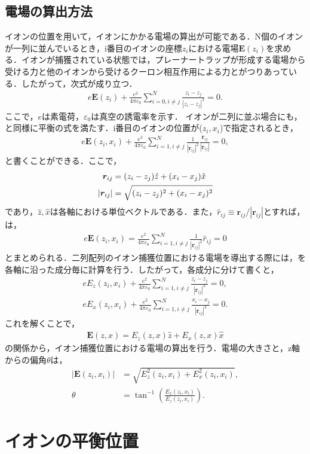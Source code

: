 \subsection{電場の算出方法}
イオンの位置を用いて，イオンにかかる電場の算出が可能である．N個のイオンが一列に並んでいるとき，i番目のイオンの座標$z_{i}$における電場$\bm{E}(z_{i})$を求める．イオンが捕獲されている状態では，プレーナートラップが形成する電場から受ける力と他のイオンから受けるクーロン相互作用による力とがつりあっている．したがって，次式が成り立つ．
\large
\begin{align}\label{eq:equi_string}
e\bm{E}(z_i) + \frac{e^2}{4\pi \varepsilon_0} \sum^N_{i=0,i\neq j} \frac{z_i - z_j}{|z_i - z_j|^3} = 0.
\end{align}
\normalsize
ここで，$e$は素電荷，$\varepsilon_0$は真空の誘電率を示す．
イオンが二列に並ぶ場合にも，と同様に平衡の式を満たす．i番目のイオンの位置が($z_i,x_i$)で指定されるとき，
\large
\begin{align}\label{eq:equi_array}
e\bm{E}(z_i,x_i) + \frac{e^2}{4\pi \varepsilon_0}\sum^N_{i=1,i\neq j}\frac{1}{|\bm{r}_{ij}|^2}\frac{\bm{r}_{ij}}{|\bm{r}_{ij}|} = 0,
\end{align}
\normalsize
と書くことができる．ここで，
\large
\begin{align}
\bm{r}_{ij} &= (z_i - z_j)\hat{z} + (x_i - x_j)\hat{x} \notag \\
|\bm{r}_{ij}| &= \sqrt{(z_i - z_j)^2 + (x_i - x_j)^2} \notag 
\end{align}
\normalsize
であり，$\hat{z},\hat{x}$は各軸における単位ベクトルである．また，$\hat{r}_{ij} \equiv \bm{r}_{ij}/|\bm{r}_{ij}|$とすれば，は，
\large
\begin{align}\label{eq:equi_array_2}
e\bm{E}(z_i,x_i) = \frac{e^2}{4\pi \varepsilon_0}\sum^N_{i=1,i\neq j} \frac{1}{|\bm{r}_{ij}|^2}\hat{r}_{ij} = 0
\end{align}
\normalsize
とまとめられる．二列配列のイオン捕獲位置における電場を導出する際には，を各軸に沿った成分毎に計算を行う．したがって，各成分に分けて書くと，
\large
\begin{align}
eE_z(z_i,x_i) + \frac{e^2}{4\pi \varepsilon_0} \sum^N_{i=1,i \neq j}\frac{z_i - z_j}{|\bm{r}_{ij}|^3} = 0 , \\
eE_x(z_i,x_i) + \frac{e^2}{4\pi \varepsilon_0} \sum^N_{i=1,i \neq j}\frac{x_i - x_j}{|\bm{r}_{ij}|^3} = 0 .
\end{align}
\normalsize
これを解くことで，
\large
\begin{align}
\bm{E}(z,x) = E_z(z,x)\hat{z} + E_x(z,x)\hat{x}
\end{align}
\normalsize
の関係から，イオン捕獲位置における電場の算出を行う．電場の大きさと，z軸からの偏角$\theta$は，
\large
\begin{align}
|\bm{E}(z_i,x_i)| &= \sqrt{E_z^2(z_i,x_i) + E_x^2(z_i,x_i)}, \\
\theta &= \tan^{-1} \left(\frac{E_x(z_i,x_i)}{E_z(z_i,x_i)} \right) .
\end{align}
\normalsize

\section{イオンの平衡位置}